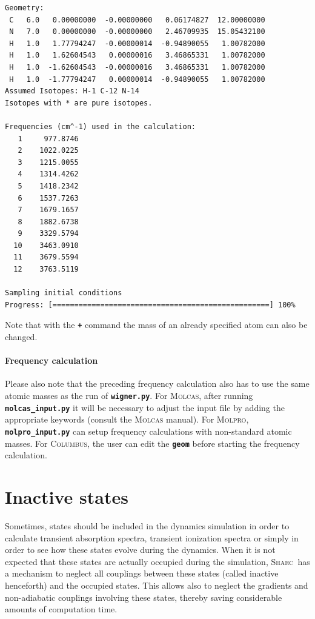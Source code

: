 \documentclass[a4paper,11pt,DIV=15,openany]{scrbook}
\newcommand{\sharc}{\textsc{Sharc}}
\newcommand{\ttt}[1]{\textbf{\texttt{#1}}}
\begin{document}
\begin{oframed}
\begin{Verbatim}[commandchars=\\\{\}]
Geometry:
 C   6.0   0.00000000  -0.00000000   0.06174827  12.00000000 
 N   7.0   0.00000000  -0.00000000   2.46709935  15.05432100 
 H   1.0   1.77794247  -0.00000014  -0.94890055   1.00782000 
 H   1.0   1.62604543   0.00000016   3.46865331   1.00782000 
 H   1.0  -1.62604543  -0.00000016   3.46865331   1.00782000 
 H   1.0  -1.77794247   0.00000014  -0.94890055   1.00782000 
Assumed Isotopes: H-1 C-12 N-14 
Isotopes with * are pure isotopes.

Frequencies (cm^-1) used in the calculation:
   1     977.8746
   2    1022.0225
   3    1215.0055
   4    1314.4262
   5    1418.2342
   6    1537.7263
   7    1679.1657
   8    1882.6738
   9    3329.5794
  10    3463.0910
  11    3679.5594
  12    3763.5119

Sampling initial conditions
Progress: [==================================================] 100%
\end{Verbatim}
\end{oframed}

\normalsize
Note that with the \ttt{+} command the mass of an already specified atom can also be changed. 

\paragraph{Frequency calculation}

Please also note that the preceding frequency calculation also has to use the same atomic masses as the run of \ttt{wigner.py}. 
For \textsc{Molcas}, after running \ttt{molcas\_input.py} it will be necessary to adjust the input file by adding the appropriate keywords (consult the \textsc{Molcas} manual).
For \textsc{Molpro}, \ttt{molpro\_input.py} can setup frequency calculations with non-standard atomic masses. 
For \textsc{Columbus}, the user can edit the \ttt{geom} before starting the frequency calculation.




\section{Inactive states}

Sometimes, states should be included in the dynamics simulation in order to calculate transient absorption spectra, transient ionization spectra or simply in order to see how these states evolve during the dynamics. When it is not expected that these states are actually occupied during the simulation, \sharc\ has a mechanism to neglect all couplings between these states (called inactive henceforth) and the occupied states. This allows also to neglect the gradients and non-adiabatic couplings involving these states, thereby saving considerable amounts of computation time. 
\end{document}
